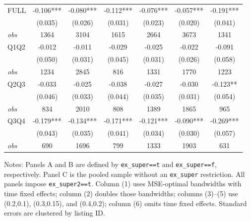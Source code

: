 \begin{table}[!htbp]
\begin{tabular}{lcccccc}
FULL & -0.106*** & -0.080*** & -0.112*** & -0.076*** & -0.057*** & -0.191*** \\
 & (0.035) & (0.026) & (0.031) & (0.023) & (0.020) & (0.041) \\
\textit{obs} & 1364 & 3104 & 1615 & 2664 & 3673 & 1341 \\
Q1Q2 & -0.012 & -0.011 & -0.029 & -0.025 & -0.022 & -0.091 \\
 & (0.050) & (0.031) & (0.045) & (0.031) & (0.026) & (0.058) \\
\textit{obs} & 1234 & 2845 & 816 & 1331 & 1770 & 1223 \\
Q2Q3 & -0.033 & -0.025 & -0.038 & -0.027 & -0.030 & -0.123** \\
 & (0.046) & (0.033) & (0.044) & (0.035) & (0.031) & (0.054) \\
\textit{obs} & 834 & 2010 & 808 & 1389 & 1865 & 965 \\
Q3Q4 & -0.179*** & -0.134*** & -0.171*** & -0.121*** & -0.090*** & -0.269*** \\
 & (0.043) & (0.035) & (0.041) & (0.034) & (0.030) & (0.057) \\
\textit{obs} & 690 & 1696 & 799 & 1333 & 1903 & 631 \\
\bottomrule
\end{tabular}
\begin{minipage}{0.98\textwidth}\footnotesize
Notes: Panels A and B are defined by \texttt{ex\_super==t} and \texttt{ex\_super==f}, respectively. Panel C is the pooled sample without an \texttt{ex\_super} restriction. All panels impose \texttt{ex\_super2==t}. Column (1) uses MSE-optimal bandwidths with time fixed effects; column (2) doubles those bandwidths; columns (3)--(5) use (0.2,0.1), (0.3,0.15), and (0.4,0.2); column (6) omits time fixed effects. Standard errors are clustered by listing ID.
\end{minipage}
\end{table}
